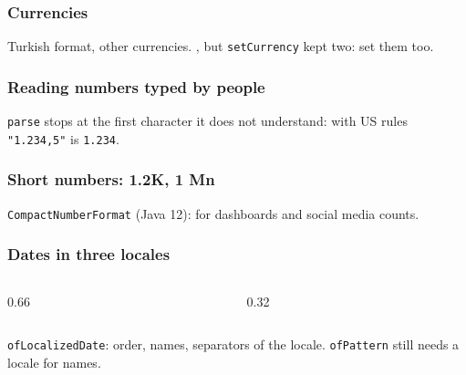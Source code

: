 \documentclass[aspectratio=169,10pt,compress]{beamer}
\begin{document}
\begin{frame}[t,fragile] \frametitle{Currencies}

  \vspace{0.1em}
  \small Turkish format, other currencies. , but \texttt{setCurrency} kept two: set them too.
\end{frame}




\begin{frame}[t,fragile] \frametitle{Reading numbers typed by people}

  \vspace{0.1em}
  \small \texttt{parse} stops at the first character it does not understand: with US rules \texttt{"1.234,5"} is \texttt{1.234}.
\end{frame}




\begin{frame}[t,fragile] \frametitle{Short numbers: 1.2K, 1 Mn}

  \vspace{0.1em}
  \small \texttt{CompactNumberFormat} (Java 12): for dashboards and social media counts.
\end{frame}





\begin{frame}[t,fragile] \frametitle{Dates in three locales}
  \begin{columns}[T]
    \begin{column}{0.66\textwidth}
    \end{column}
    \begin{column}{0.32\textwidth}
    \end{column}
  \end{columns}

  \vspace{0.1em}
  \small \texttt{ofLocalizedDate}: order, names, separators of the locale. \texttt{ofPattern} still needs a locale for names.
\end{frame}
\end{document}
